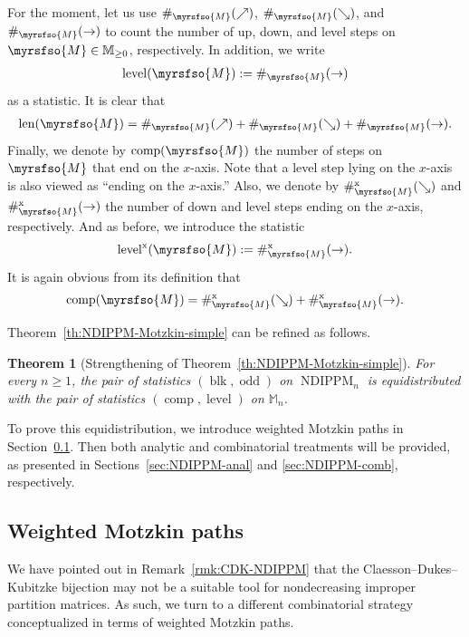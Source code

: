 \documentclass[12pt,reqno]{amsart}
\numberwithin{equation}{section}
\theoremstyle{theorem}
\newtheorem{theorem}{Theorem}[section]
\theoremstyle{definition}
\theoremstyle{named}
\newcommand{\NDIPPM}{\operatorname{NDIPPM}}
\newcommand{\odd}{\operatorname{odd}}
\newcommand{\blk}{\operatorname{blk}}
\newcommand{\len}{\operatorname{len}}
\newcommand{\comp}{\operatorname{comp}}
\newcommand{\level}{\operatorname{level}}
\newcommand{\x}{\operatorname{x}}
\newcommand{\cM}{\myrsfso{M}}
\newcommand{\bbM}{\mathbb{M}}
\begin{document}
For the moment, let us use $\#_{\cM}(\nearrow)$, $\#_{\cM}(\searrow)$, and $\#_{\cM}(\rightarrow)$ to count the number of up, down, and level steps on $\cM \in \bbM_{\ge 0}$, respectively. In addition, we write
\begin{align*}
	\level(\cM) := \#_{\cM}(\rightarrow)
\end{align*}
as a statistic. It is clear that
\begin{align*}
	\len(\cM) = \#_{\cM}(\nearrow) + \#_{\cM}(\searrow) + \#_{\cM}(\rightarrow).
\end{align*}
Finally, we denote by $\comp(\cM)$ the number of steps on $\cM$ that end on the $x$-axis. Note that a level step lying on the $x$-axis is also viewed as ``ending on the $x$-axis.'' Also, we denote by $\#_{\cM}^{\x}(\searrow)$ and $\#_{\cM}^{\x}(\rightarrow)$ the number of down and level steps ending on the $x$-axis, respectively. And as before, we introduce the statistic
\begin{align*}
	\level^{\x}(\cM) := \#_{\cM}^{\x}(\rightarrow).
\end{align*}
It is again obvious from its definition that
\begin{align*}
	\comp(\cM) = \#_{\cM}^{\x}(\searrow) + \#_{\cM}^{\x}(\rightarrow).
\end{align*}

Theorem~\ref{th:NDIPPM-Motzkin-simple} can be refined as follows.

\begin{theorem}[Strengthening of Theorem~\ref{th:NDIPPM-Motzkin-simple}]\label{th:NDIPPM-Motzkin}
	For every $n\ge 1$, the pair of statistics $(\blk,\odd)$ on $\NDIPPM_n$ is equidistributed with the pair of statistics $(\comp,\level)$ on $\bbM_n$.
\end{theorem}

To prove this equidistribution, we introduce weighted Motzkin paths in Section~\ref{sec:weighted-M}. Then both analytic and combinatorial treatments will be provided, as presented in Sections~\ref{sec:NDIPPM-anal} and \ref{sec:NDIPPM-comb}, respectively.

\subsection{Weighted Motzkin paths}\label{sec:weighted-M}

We have pointed out in Remark~\ref{rmk:CDK-NDIPPM} that the Claesson--Dukes--Kubitzke bijection may not be a suitable tool for nondecreasing improper partition matrices. As such, we turn to a different combinatorial strategy conceptualized in terms of weighted Motzkin paths.
\end{document}
